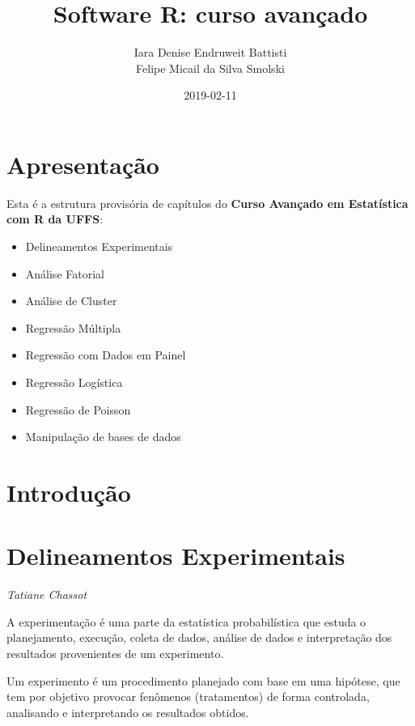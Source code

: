 \documentclass[12pt,brazil,oneside]{book}
\title{Software R: curso avançado}
\author{Iara Denise Endruweit Battisti \\ Felipe Micail da Silva Smolski}
\date{2019-02-11}
\providecommand{\tightlist}{%
  \setlength{\itemsep}{0pt}\setlength{\parskip}{0pt}}
\begin{document}
\maketitle

{
\setcounter{tocdepth}{1}
\tableofcontents
}
\hypertarget{apresentacao}{%
\chapter*{Apresentação}\label{apresentacao}}

\frenchspacing

Esta é a estrutura provisória de capítulos do \textbf{Curso Avançado em Estatística com R da UFFS}:

\begin{itemize}
\tightlist
\item
  Delineamentos Experimentais
\item
  Análise Fatorial
\item
  Análise de Cluster
\item
  Regressão Múltipla
\item
  Regressão com Dados em Painel
\item
  Regressão Logística
\item
  Regressão de Poisson
\item
  Manipulação de bases de dados
\end{itemize}

\hypertarget{introducao}{%
\chapter*{Introdução}\label{introducao}}

\hypertarget{delineamentos-experimentais}{%
\chapter{Delineamentos Experimentais}\label{delineamentos-experimentais}}

\emph{Tatiane Chassot}

\begin{flushright}
\emph{}
\end{flushright}

A experimentação é uma parte da estatística probabilística que estuda o planejamento, execução, coleta de dados, análise de dados e interpretação dos resultados provenientes de um experimento.

Um experimento é um procedimento planejado com base em uma hipótese, que tem por objetivo provocar fenômenos (tratamentos) de forma controlada, analisando e interpretando os
resultados obtidos.
\end{document}
